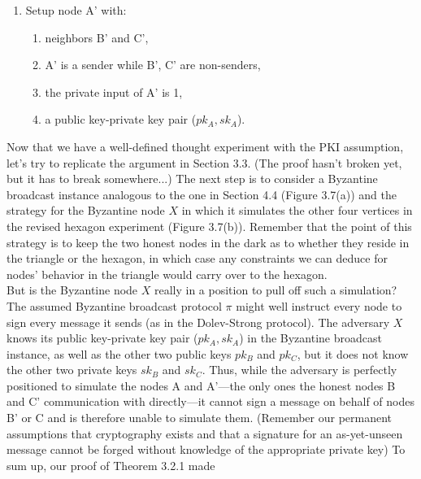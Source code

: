 {\begin{enumerate}
\begin{enumerate}[label=(\roman*)]
        \item neighbors A' and C,
        \item A' is a sender while B', C are non-senders,
        \item a public key-private key pair ($pk_B, sk_B$).
    \end{enumerate}
    \item Setup node A' with:
    \begin{enumerate}[label=(\roman*)]
        \item neighbors B' and C',
        \item A' is a sender while B', C' are non-senders,
        \item the private input of A' is 1,
        \item a public key-private key pair ($pk_A, sk_A$).
    \end{enumerate}
\end{enumerate}}
\newpage
Now that we have a well-defined thought experiment with the PKI assumption, let’s try
to replicate the argument in Section 3.3. (The proof hasn't broken yet, but it has to break
somewhere...) The next step is to consider a Byzantine broadcast instance analogous to
the one in Section 4.4 (Figure 3.7(a)) and the strategy for the Byzantine node $X$ in which it
simulates the other four vertices in the revised hexagon experiment (Figure 3.7(b)). Remember
that the point of this strategy is to keep the two honest nodes in the dark as to whether
they reside in the triangle or the hexagon, in which case any constraints we can deduce for
nodes’ behavior in the triangle would carry over to the hexagon.\\
But is the Byzantine node $X$ really in a position to pull off such a simulation? The
assumed Byzantine broadcast protocol $\pi$ might well instruct every node to sign every message
it sends (as in the Dolev-Strong protocol). The adversary $X$ knows its public key-private key
pair ($pk_A, sk_A$) in the Byzantine broadcast instance, as well as the other two public keys $pk_B$
and $pk_C$, but it does not know the other two private keys $sk_B$ and $sk_C$. Thus, while the
adversary is perfectly positioned to simulate the nodes A and A'—the only ones the honest nodes B and C' communication with directly—it cannot sign a message on behalf of nodes B' or C and is therefore unable to simulate them. (Remember our permanent assumptions that
cryptography exists and that a signature for an as-yet-unseen message cannot be forged
without knowledge of the appropriate private key) To sum up, our proof of Theorem 3.2.1 made
